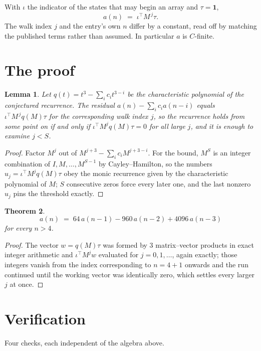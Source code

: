 \documentclass[11pt,a4paper]{article}
\theoremstyle{plain}
\newtheorem{theorem}{Theorem}
\newtheorem{lemma}[theorem]{Lemma}
\theoremstyle{definition}
\begin{document}
With $\iota$ the indicator of the states that may begin an array and $\tau=\mathbf{1}$,
\[
a(n)\;=\;\iota^{\!\top}M^{\,j}\tau .
\]
The walk index $j$ and the entry's own $n$ differ by a constant, read off by matching the
published terms rather than assumed. In particular $a$ is $C$-finite.

\section{The proof}

\begin{lemma}\label{lem:crit}
Let $q(t)=t^{3}-\sum_i c_it^{3-i}$ be the characteristic polynomial of the
conjectured recurrence. The residual $a(n)-\sum_ic_ia(n-i)$ equals
$\iota^{\!\top}M^{\,j}q(M)\tau$ for the corresponding walk index $j$, so the recurrence
holds from some point on if and only if $\iota^{\!\top}M^{j}q(M)\tau=0$ for all large $j$,
and it is enough to examine $j<S$.
\end{lemma}

\begin{proof}
Factor $M^{j}$ out of $M^{j+3}-\sum_ic_iM^{j+3-i}$. For the bound, $M^{S}$
is an integer combination of $I,M,\dots,M^{S-1}$ by Cayley--Hamilton, so the numbers
$u_j=\iota^{\!\top}M^{j}q(M)\tau$ obey the monic recurrence given by the characteristic
polynomial of $M$; $S$ consecutive zeros force every later one, and the last nonzero $u_j$
pins the threshold exactly.
\end{proof}

\begin{theorem}
\[
a(n)\;=\;64\,a(n-1) - 960\,a(n-2) + 4096\,a(n-3)
\]
for every $n>4$.
\end{theorem}

\begin{proof}
The vector $w=q(M)\tau$ was formed by $3$ matrix--vector products in exact integer
arithmetic and $\iota^{\!\top}M^{j}w$ evaluated for $j=0,1,\dots$, again exactly; those
integers vanish from the index corresponding to $n=4+1$ onwards and the run continued
until the working vector was identically zero, which settles every larger $j$ at once.
\end{proof}

\section{Verification}

Four checks, each independent of the algebra above.
\end{document}
